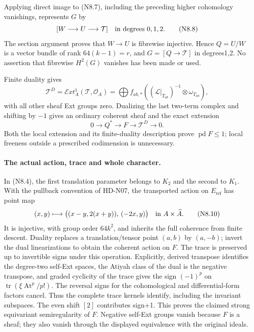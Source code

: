 Applying direct image to (N8.7), including the preceding higher
cohomology vanishings, represents $G$ by
\[
 [W\longrightarrow U\longrightarrow\mathcal T]
 \quad\hbox{in degrees }0,1,2.                            \tag{N8.8}
\]
The section argument proves that $W\to U$ is fibrewise injective.
Hence $Q=U/W$ is a vector bundle of rank $64(k-1)=r$, and
$G=[Q\to\mathcal T]$ in degrees1,2. No assertion that fibrewise
$H^2(G)$ vanishes has been made or used.

Finite duality gives
\[
 \mathcal T^D=\mathcal E xt^1_A(\mathcal T,\mathcal O_A)
 =\bigoplus f_{ab,*}
       ((\mathcal L|_{T_{ab}})^{-1}\otimes\omega_{T_{ab}}),
\]
with all other sheaf Ext groups zero. Dualizing the last two-term
complex and shifting by $-1$ gives an ordinary coherent sheaf and
the exact extension
\[
 0\longrightarrow Q^*\longrightarrow F
   \longrightarrow\mathcal T^D\longrightarrow0.          \tag{N8.9}
\]
Both the local extension and its finite-duality description prove
$\operatorname{pd}F\le1$; local freeness outside a prescribed
codimension is unnecessary.

\paragraph{The actual action, trace and whole character.}
In (N8.4), the first translation parameter belongs to $K_2$ and
the second to $K_1$. With the pullback convention of HD-N07,
the transported action on $E_{\mathrm{ref}}$ has point map
\[
 (x,y)\longmapsto
 \bigl((x-y,2(x+y)),\,(-2x,y)\bigr)
 \quad\hbox{in }A\times\widehat A.                       \tag{N8.10}
\]
It is injective, with group order $64k^2$, and inherits the full
coherence from finite descent. Duality replaces a translation/tensor
point $(a,b)$ by $(a,-b)$; invert the dual linearizations to obtain
the coherent action on $F$. The trace is preserved up to invertible
signs under this operation. Explicitly, derived transpose identifies
the degree-two self-Ext spaces, the Atiyah class of the dual is
the negative transpose, and graded cyclicity of the trace gives
the sign $(-1)^p$ on
$\operatorname{tr}(\xi\operatorname{At}^p/p!)$.
The reversal signs for the cohomological and differential-form
factors cancel. Thus the complete trace kernels identify, including
the invariant subspaces. The even shift $[2]$ contributes sign+1.
This proves the claimed strong equivariant semiregularity of $F$.
Negative self-Ext groups vanish because $F$ is a sheaf; they also
vanish through the displayed equivalence with the original ideals.

